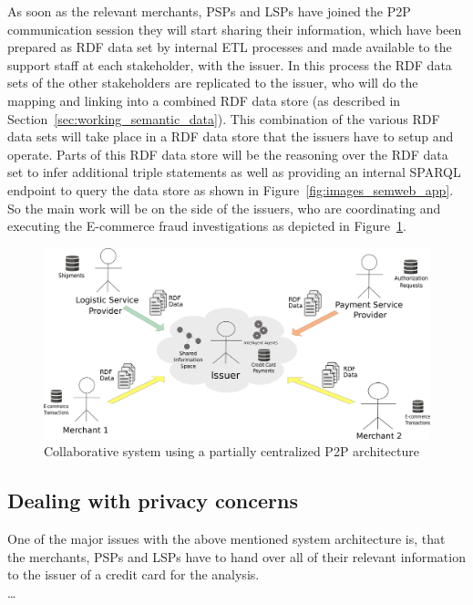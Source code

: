 As soon as the relevant merchants, \gls{PSP}s and \gls{LSP}s have joined the \gls{P2P} communication session they will start sharing their information, which have been prepared as \gls{RDF} data set by internal \gls{ETL} processes and made available to the support staff at each stakeholder, with the issuer. In this process the \gls{RDF} data sets of the other stakeholders are replicated to the issuer, who will do the mapping and linking into a combined \gls{RDF} data store (as described in Section~\ref{sec:working_semantic_data}). This combination of the various \gls{RDF} data sets will take place in a \gls{RDF} data store that the issuers have to setup and operate. Parts of this \gls{RDF} data store will be the reasoning over the \gls{RDF} data set to infer additional triple statements as well as providing an internal \gls{SPARQL} endpoint to query the data store as shown in Figure~\ref{fig:images_semweb_app}. \\

So the main work will be on the side of the issuers, who are coordinating and executing the \gls{E-commerce} fraud investigations as depicted in Figure~\ref{fig:images_p2p_centralized}.\@

\begin{figure}[H]
	\centering
		\includegraphics[width=0.9\columnwidth]{images/system_P2P_centralized.pdf}
	\caption{Collaborative system using a partially centralized \gls{P2P} architecture}
\label{fig:images_p2p_centralized}
\end{figure}


\subsection{Dealing with privacy concerns}
\label{subsec:p2p_partially_issuer_privacy}

One of the major issues with the above mentioned system architecture is, that the merchants, \gls{PSP}s and \gls{LSP}s have to hand over all of their relevant information to the issuer of a credit card for the analysis. \\
\ldots


